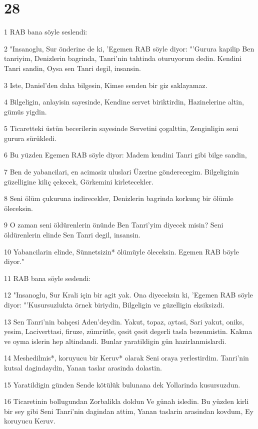 \chapter{28}

\par 1 RAB bana söyle seslendi:
\par 2 "Insanoglu, Sur önderine de ki, 'Egemen RAB söyle diyor: "'Gurura kapilip Ben tanriyim, Denizlerin bagrinda, Tanri'nin tahtinda oturuyorum dedin. Kendini Tanri sandin, Oysa sen Tanri degil, insansin.
\par 3 Iste, Daniel'den daha bilgesin, Kimse senden bir giz saklayamaz.
\par 4 Bilgeligin, anlayisin sayesinde, Kendine servet biriktirdin, Hazinelerine altin, gümüs yigdin.
\par 5 Ticaretteki üstün becerilerin sayesinde Servetini çogalttin, Zenginligin seni gurura sürükledi.
\par 6 Bu yüzden Egemen RAB söyle diyor: Madem kendini Tanri gibi bilge sandin,
\par 7 Ben de yabancilari, en acimasiz uluslari Üzerine gönderecegim. Bilgeliginin güzelligine kiliç çekecek, Görkemini kirletecekler.
\par 8 Seni ölüm çukuruna indirecekler, Denizlerin bagrinda korkunç bir ölümle öleceksin.
\par 9 O zaman seni öldürenlerin önünde Ben Tanri'yim diyecek misin? Seni öldürenlerin elinde Sen Tanri degil, insansin.
\par 10 Yabancilarin elinde, Sünnetsizin* ölümüyle öleceksin. Egemen RAB böyle diyor."
\par 11 RAB bana söyle seslendi:
\par 12 "Insanoglu, Sur Krali için bir agit yak. Ona diyeceksin ki, 'Egemen RAB söyle diyor: "'Kusursuzlukta örnek biriydin, Bilgeligin ve güzelligin eksiksizdi.
\par 13 Sen Tanri'nin bahçesi Aden'deydin. Yakut, topaz, aytasi, Sari yakut, oniks, yesim, Laciverttasi, firuze, zümrütle, çesit çesit degerli tasla bezenmistin. Kakma ve oyma islerin hep altindandi. Bunlar yaratildigin gün hazirlanmislardi.
\par 14 Meshedilmis*, koruyucu bir Keruv* olarak Seni oraya yerlestirdim. Tanri'nin kutsal dagindaydin, Yanan taslar arasinda dolastin.
\par 15 Yaratildigin günden Sende kötülük bulunana dek Yollarinda kusursuzdun.
\par 16 Ticaretinin bollugundan Zorbalikla doldun Ve günah isledin. Bu yüzden kirli bir sey gibi Seni Tanri'nin dagindan attim, Yanan taslarin arasindan kovdum, Ey koruyucu Keruv.
